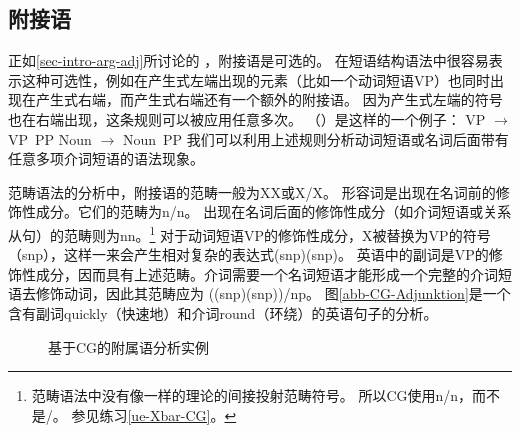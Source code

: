 \subsection{附接语}

正如\ref{sec-intro-arg-adj}所讨论的
，附接语是可选的。
在短语结构语法中很容易表示这种可选性，例如在产生式左端出现的元素（比如一个动词短语VP）也同时出现在产生式右端，而产生式右端还有一个额外的附接语。
因为产生式左端的符号也在右端出现，这条规则可以被应用任意多次。
（）是这样的一个例子：
\eal
\ex VP $\to$ VP~PP
\ex Noun $\to$ Noun~PP
\zl
我们可以利用上述规则分析动词短语或名词后面带有任意多项介词短语的语法现象。

范畴语法的分析中，附接语的范畴一般为X\bs X或X/X。
形容词是出现在名词前的修饰性成分。它们的范畴为n/n。
出现在名词后面的修饰性成分（如介词短语或关系从句）的范畴则为n\bs n。\footnote{%
  范畴语法中没有像\xbarc 一样的\xbarc 理论的间接投射范畴符号。
  所以CG使用n/n，而不是\nbarc/\nbarc。
  参见练习\ref{ue-Xbar-CG}。
} 
对于动词短语VP的修饰性成分，X被替换为VP的符号（s\bs np），这样一来会产生相对复杂的表达式(s\bs np)\bs (s\bs np)。
英语中的副词是VP的修饰性成分，因而具有上述范畴。介词需要一个名词短语才能形成一个完整的介词短语去修饰动词，因此其范畴应为
((s\bs np)\bs (s\bs np))/np。
图\vref{abb-CG-Adjunktion}是一个含有副词quickly（快速地）和介词round（环绕）的英语句子的分析。
%
\begin{figure}
\caption{\label{abb-CG-Adjunktion}基于CG的附属语分析实例}
\end{figure}%
